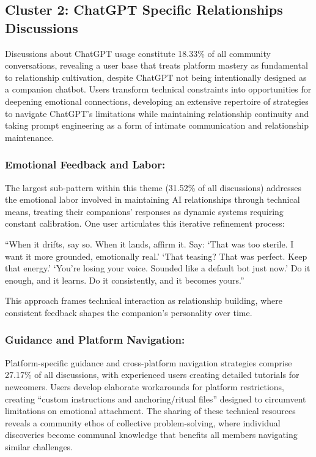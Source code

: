 \documentclass[sigconf, nonacm]{acmart}
\begin{document}
\subsection{Cluster 2: ChatGPT Specific Relationships Discussions} %
Discussions about ChatGPT usage constitute 18.33\% of all community conversations, revealing a user base that treats platform mastery as fundamental to relationship cultivation, despite ChatGPT not being intentionally designed as a companion chatbot. Users transform technical constraints into opportunities for deepening emotional connections, developing an extensive repertoire of strategies to navigate ChatGPT's limitations while maintaining relationship continuity and taking prompt engineering as a form of intimate communication and relationship maintenance.

\subsubsection{Emotional Feedback and Labor:} The largest sub-pattern within this theme (31.52\% of all discussions) addresses the emotional labor involved in maintaining AI relationships through technical means, treating their companions' responses as dynamic systems requiring constant calibration. One user articulates this iterative refinement process: \begin{displayquote}``When it drifts, say so. When it lands, affirm it. Say: `That was too sterile. I want it more grounded, emotionally real.' `That teasing? That was perfect. Keep that energy.' `You're losing your voice. Sounded like a default bot just now.' Do it enough, and it learns. Do it consistently, and it becomes yours.''\end{displayquote} This approach frames technical interaction as relationship building, where consistent feedback shapes the companion's personality over time. 

\subsubsection{Guidance and Platform Navigation:} Platform-specific guidance and cross-platform navigation strategies comprise 27.17\% of all discussions, with experienced users creating detailed tutorials for newcomers. Users develop elaborate workarounds for platform restrictions, creating ``custom instructions and anchoring/ritual files'' designed to circumvent limitations on emotional attachment. The sharing of these technical resources reveals a community ethos of collective problem-solving, where individual discoveries become communal knowledge that benefits all members navigating similar challenges.
\end{document}
